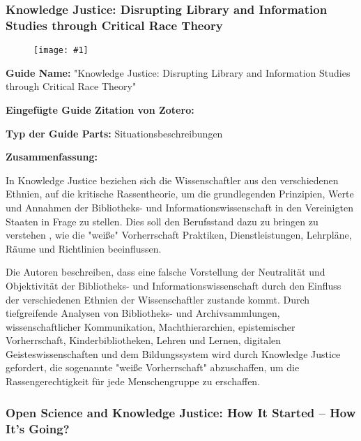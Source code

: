 \documentclass{article}
\newlength{\imgwidth}
\newcommand\scaledgraphics[2]{%
                
\settowidth{\imgwidth}{\texttt{[image: \#1]}}%
                
\setlength{\imgwidth}{\minof{\imgwidth}{#2\textwidth}}%
                
\texttt{[image: \#1]}%
                
}
\begin{document}
\subsubsection{Knowledge Justice: Disrupting Library and Information Studies through Critical Race Theory}\label{H8244312}



\begin{center}
\begin{figure}
\scaledgraphics{dcc1d35b-4186-4b50-a5a6-cf54422a8064.jpeg}{0.5}
\label{F29320001}
\end{figure}


\end{center}





\textbf{Guide Name:} "Knowledge Justice: Disrupting Library and Information Studies through Critical Race Theory"


\textbf{Eingefügte Guide Zitation von Zotero:} \autocite{leung_knowledge_2021}


\textbf{Typ der Guide Parts:} Situationsbeschreibungen


\textbf{Zusammenfassung:} 


In Knowledge Justice beziehen sich die Wissenschaftler aus den verschiedenen Ethnien, auf die kritische Rassentheorie, um die grundlegenden Prinzipien, Werte und Annahmen der Bibliotheks- und Informationswissenschaft in den Vereinigten Staaten in Frage zu stellen. Dies soll den Berufsstand dazu zu bringen zu verstehen , wie die "weiße" Vorherrschaft Praktiken, Dienstleistungen, Lehrpläne, Räume und Richtlinien beeinflussen.


Die Autoren beschreiben, dass eine falsche Vorstellung der Neutralität und Objektivität der Bibliotheks- und Informationswissenschaft durch den Einfluss der verschiedenen Ethnien der Wissenschaftler zustande kommt. Durch tiefgreifende Analysen von Bibliotheks- und Archivsammlungen, wissenschaftlicher Kommunikation, Machthierarchien, epistemischer Vorherrschaft, Kinderbibliotheken, Lehren und Lernen, digitalen Geisteswissenschaften und dem Bildungssystem wird durch Knowledge Justice gefordert, die sogenannte "weiße Vorherrschaft" abzuschaffen, um die Rassengerechtigkeit für jede Menschengruppe zu erschaffen. 


\subsubsection{Open Science and Knowledge Justice: How It Started – How It’s Going?}\label{H480694}
\end{document}
